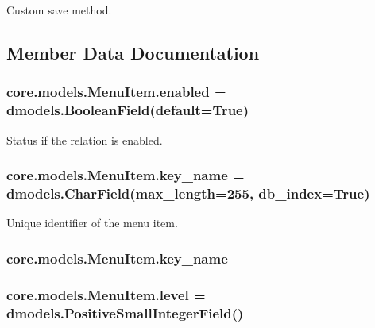 Custom save method. 



\subsection{Member Data Documentation}
\hypertarget{classcore_1_1models_1_1MenuItem_ad8a9b116de08fe5fb590ac565c10917a}{
\subsubsection[{enabled}]{\setlength{\rightskip}{0pt plus 5cm}core.\-models.\-Menu\-Item.\-enabled = dmodels.\-Boolean\-Field(default=True)\hspace{0.3cm}{\ttfamily [static]}}}\label{classcore_1_1models_1_1MenuItem_ad8a9b116de08fe5fb590ac565c10917a}


Status if the relation is enabled. 

\hypertarget{classcore_1_1models_1_1MenuItem_a6eccff1165c95be4b9c0efee213e3878}{
\subsubsection[{key\-\_\-name}]{\setlength{\rightskip}{0pt plus 5cm}core.\-models.\-Menu\-Item.\-key\-\_\-name = dmodels.\-Char\-Field(max\-\_\-length=255, db\-\_\-index=True)\hspace{0.3cm}{\ttfamily [static]}}}\label{classcore_1_1models_1_1MenuItem_a6eccff1165c95be4b9c0efee213e3878}


Unique identifier of the menu item. 

\hypertarget{classcore_1_1models_1_1MenuItem_a6eccff1165c95be4b9c0efee213e3878}{
\subsubsection[{key\-\_\-name}]{\setlength{\rightskip}{0pt plus 5cm}core.\-models.\-Menu\-Item.\-key\-\_\-name}}\label{classcore_1_1models_1_1MenuItem_a6eccff1165c95be4b9c0efee213e3878}
\hypertarget{classcore_1_1models_1_1MenuItem_a57fc994079c4c38d7ef278c6d364f435}{
\subsubsection[{level}]{\setlength{\rightskip}{0pt plus 5cm}core.\-models.\-Menu\-Item.\-level = dmodels.\-Positive\-Small\-Integer\-Field()\hspace{0.3cm}{\ttfamily [static]}}}\label{classcore_1_1models_1_1MenuItem_a57fc994079c4c38d7ef278c6d364f435}


